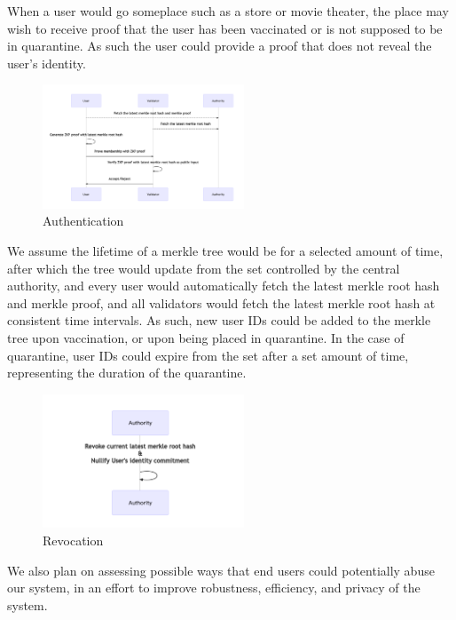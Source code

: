 \documentclass[sigconf, nonacm=true]{acmart}
\begin{document}
When a user would go someplace such as a store or movie theater, the place may wish to receive proof that the user has been vaccinated or is not supposed to be in quarantine. As such the user could provide a proof that does not reveal the user's identity.

\begin{figure}[H]
    \centering
    \includegraphics[width=6cm]{image/authentication.png}
    \caption{Authentication}
    \label{fig:auth}
\end{figure}

We assume the lifetime of a merkle tree would be for a selected amount of time, after which the tree would update from the set controlled by the central authority, and every user would automatically fetch the latest merkle root hash and merkle proof, and all validators would fetch the latest merkle root hash at consistent time intervals. As such, new user IDs could be added to the merkle tree upon vaccination, or upon being placed in quarantine. In the case of quarantine, user IDs could expire from the set after a set amount of time, representing the duration of the quarantine.

\begin{figure}[H]
    \centering
    \includegraphics[width=6cm]{image/revocation.png}
    \caption{Revocation}
    \label{fig:rev}
\end{figure}

We also plan on assessing possible ways that end users could potentially abuse our system, in an effort to improve robustness, efficiency, and privacy of the system.



\end{document}

